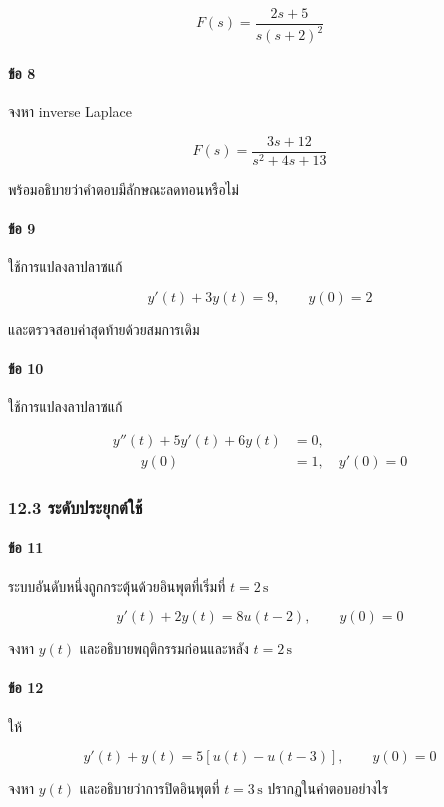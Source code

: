 \[
F(s)=\frac{2s+5}{s(s+2)^2}
\]

\paragraph{ข้อ 8}

จงหา inverse Laplace

\[
F(s)=\frac{3s+12}{s^2+4s+13}
\]

พร้อมอธิบายว่าคำตอบมีลักษณะลดทอนหรือไม่

\paragraph{ข้อ 9}

ใช้การแปลงลาปลาซแก้

\[
y'(t)+3y(t)=9,\qquad y(0)=2
\]

และตรวจสอบค่าสุดท้ายด้วยสมการเดิม

\paragraph{ข้อ 10}

ใช้การแปลงลาปลาซแก้

\[
\begin{aligned}
    y''(t)+5y'(t)+6y(t)&=0,\\
    \qquad y(0)&=1,\quad y'(0)=0
\end{aligned}
\]

\subsubsection{12.3 ระดับประยุกต์ใช้}

\paragraph{ข้อ 11}

ระบบอันดับหนึ่งถูกกระตุ้นด้วยอินพุตที่เริ่มที่ $t=2\,\mathrm{s}$

\[
y'(t)+2y(t)=8u(t-2),\qquad y(0)=0
\]

จงหา $y(t)$ และอธิบายพฤติกรรมก่อนและหลัง $t=2\,\mathrm{s}$

\paragraph{ข้อ 12}

ให้

\[
y'(t)+y(t)=5[u(t)-u(t-3)],\qquad y(0)=0
\]

จงหา $y(t)$ และอธิบายว่าการปิดอินพุตที่ $t=3\,\mathrm{s}$ ปรากฏในคำตอบอย่างไร


